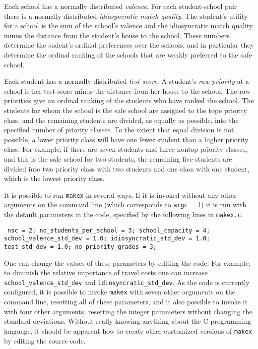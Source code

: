 \documentclass[12pt]{article}
\theoremstyle{definition}
\begin{document}
Each school has a normally distributed \emph{valence}.  For each
student-school pair there is a normally distributed
\emph{idiosyncratic match quality}.  The student's utility for a
school is the sum of the school's valence and the idiosyncratic match
quality minus the distance from the student's house to the school.
These numbers determine the sudent's ordinal preferences over the
schools, and in particular they determine the ordinal ranking of the
schools that are weakly preferred to the safe school.

Each student has a normally distributed \emph{test score}.  A
student's \emph{raw priority} at a school is her test score minus the
distance from her house to the school.  The raw priorities give an
ordinal ranking of the students who have ranked the school.  The
students for whom the school is the safe school are assigned to the
tope priority class, and the remaining students are divided, as
equally as possible, into the specified number of priority classes.
To the extent that equal division is not possible, a lower priority
class will have one fewer student than a higher priority class.  For
example, if there are seven students and three nontop priority
classes, and this is the safe school for two students, the remaining
five students are divided into two priority class with two students
and one class with one student, which is the lowest priority class.

It is possible to run \texttt{makex} in several ways.  If it is
invoked without any other arguments on the command line (which
corresponds to \texttt{argc} = 1) it is run with the default
parameters in the code, specified by the following lines in
\texttt{makex.c}.
\begin{obeylines}\texttt{
  nsc = 2;
  no\_students\_per\_school = 3;
  school\_capacity = 4;
  school\_valence\_std\_dev = 1.0;
  idiosyncratic\_std\_dev = 1.0;
  test\_std\_dev = 1.0;
  no\_priority\_grades = 3;
}
\end{obeylines} \noindent
One can change the values of these parameters by editing the code.
For example, to diminish the relative importance of travel costs one
can increase \texttt{school\_valence\_std\_dev} and
\texttt{idiosyncratic\_std\_dev}.  As the code is currently
configured, it is possible to invoke \texttt{makex} with seven other
arguments on the command line, resetting all of these parameters, and
it also possible to invoke it with four other arguments, resetting the
integer parameters without changing the standard deviations.  Without
really knowing anything about the C programming language, it should be
apparent how to create other customized versions of \texttt{makex} by
editing the source code.
\end{document}

